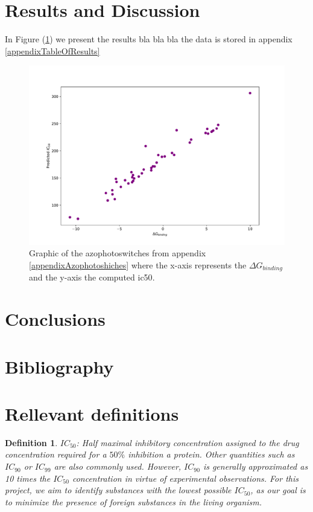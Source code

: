 \documentclass[11pt]{article}
\newtheorem{definition}{Definition}
\begin{document}
\newpage
\section{Results and Discussion}\label{sectionResultsAndDiscussion}
In Figure (\ref{figureGraphicGbindingIC50}) we present the results bla bla bla the data is stored in appendix \ref{appendixTableOfResults}

\begin{figure}[H]
	\centering
	\includegraphics[width = \textwidth, trim={1.75cm 0.8cm 2.5cm 2cm}, clip]{../Plots/GbindingVSIC50.pdf}
	\caption{Graphic of the azophotoswitches from appendix \ref{appendixAzophotoshiches} where the x-axis represents the $\Delta G_{binding}$ and the y-axis the computed \gls{ic50}.}
	\label{figureGraphicGbindingIC50}
\end{figure}



\section{Conclusions}
\newpage

\section{Bibliography}
\printbibliography[title = { \vspace{-1cm}}]
\newpage

\appendix
\section{Rellevant definitions}
\begin{definition}\label{definitionIC50}
$IC_{50}$: Half maximal inhibitory concentration assigned to the drug concentration required for a $50\%$ inhibition a protein. Other quantities such as $IC_{90}$ or $IC_{99}$ are also commonly used. However, $IC_{90}$ is generally approximated as 10 times the $IC_{50}$ concentration in virtue of experimental observations\cite{BookIC50}. For this project, we aim to identify substances with the lowest possible $IC_{50}$, as our goal is to minimize the presence of foreign substances in the living organism.
\end{definition}
\end{document}
